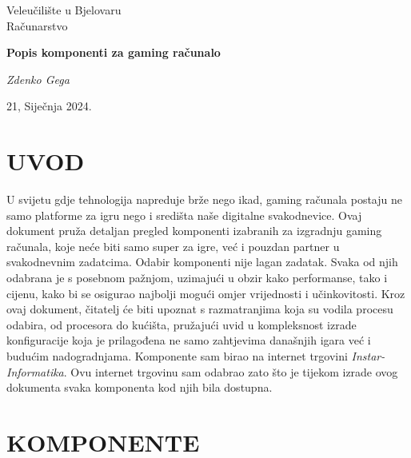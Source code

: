 \documentclass[14pt]{article}
\begin{document}
\begin{titlepage} %
\centering

    \vspace*{2cm} %
    
    {\Large Veleučilište u Bjelovaru \\ Računarstvo}\par
    \vspace{1.5cm} %
    
    {\Huge\bfseries Popis komponenti za gaming računalo}\par %
    \vspace{2cm} %
    
    {\Large\itshape Zdenko Gega}\par %
    \vfill %
    
    \vspace{1cm} %
    
    {\large 21, Siječnja 2024.}\par %

\end{titlepage}


\tableofcontents
\clearpage

\section{UVOD}
U svijetu gdje tehnologija napreduje brže nego ikad, gaming računala postaju ne samo platforme za igru nego i središta naše digitalne svakodnevice. Ovaj dokument pruža detaljan pregled komponenti izabranih za izgradnju gaming računala, koje neće biti samo super za igre, već i pouzdan partner u svakodnevnim zadatcima. Odabir komponenti nije lagan zadatak. Svaka od njih odabrana je s posebnom pažnjom, uzimajući u obzir kako performanse, tako i cijenu, kako bi se osigurao najbolji mogući omjer vrijednosti i učinkovitosti. Kroz ovaj dokument, čitatelj će biti upoznat s razmatranjima koja su vodila procesu odabira, od procesora do kućišta, pružajući uvid u kompleksnost izrade konfiguracije koja je prilagođena ne samo zahtjevima današnjih igara već i budućim nadogradnjama. Komponente sam birao na internet trgovini \textit{Instar-Informatika}. Ovu internet trgovinu sam odabrao zato što je tijekom izrade ovog dokumenta svaka komponenta kod njih bila dostupna.

\clearpage
\section{KOMPONENTE}
\end{document}

